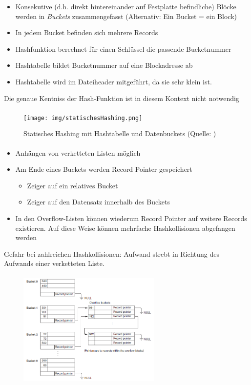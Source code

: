 {\begin{frame}{\insertsection}
\begin{itemize}
		\item Konsekutive (d.h. direkt hintereinander auf Festplatte befindliche) Blöcke werden in \textit{Buckets} zusammengefasst (Alternativ: Ein Bucket = ein Block)
		\item In jedem Bucket befinden sich mehrere Records
		\item Hashfunktion berechnet für einen Schlüssel die passende Bucketnummer 
		\item Hashtabelle bildet Bucketnummer auf eine Blockadresse ab
		\item Hashtabelle wird im Dateiheader mitgeführt, da sie sehr klein ist.
	\end{itemize}	
	\alert{Die genaue Kentniss der Hash-Funktion ist in diesem Kontext nicht notwendig}	
\end{frame}
%
\begin{frame}{\insertsection}
\framesubtitle{\insertsubsection}	
\begin{figure}
\texttt{[image: img/statischesHashing.png]}
\caption{Statisches Hashing mit Hashtabelle und Datenbuckets (Quelle: \cite[S. 610]{EN10})}
\end{figure}	
\end{frame}
%
\begin{frame}{\insertsection}
	\framesubtitle{\insertsubsection}
	\begin{itemize}
		\item Anhängen von verketteten Listen möglich
		\item Am Ende eines Buckets werden Record Pointer gespeichert
		\begin{itemize}
			\item Zeiger auf ein relatives Bucket
			\item Zeiger auf den Datensatz innerhalb des Buckets
		\end{itemize}
		\item In den Overflow-Listen können wiederum Record Pointer auf weitere Records existieren. Auf diese Weise können mehrfache Hashkollisionen abgefangen werden
	\end{itemize}	
	\alert{Gefahr bei zahlreichen Hashkollisionen: Aufwand strebt in Richtung des Aufwands einer verketteten Liste.}
\end{frame}
%
\begin{frame}{\insertsection}
	\framesubtitle{\insertsubsection}	
	\begin{center}
		\begin{figure}
			\includegraphics[width=200pt]{img/buckets.png}

\end{figure}
\end{center}
\end{frame}}
